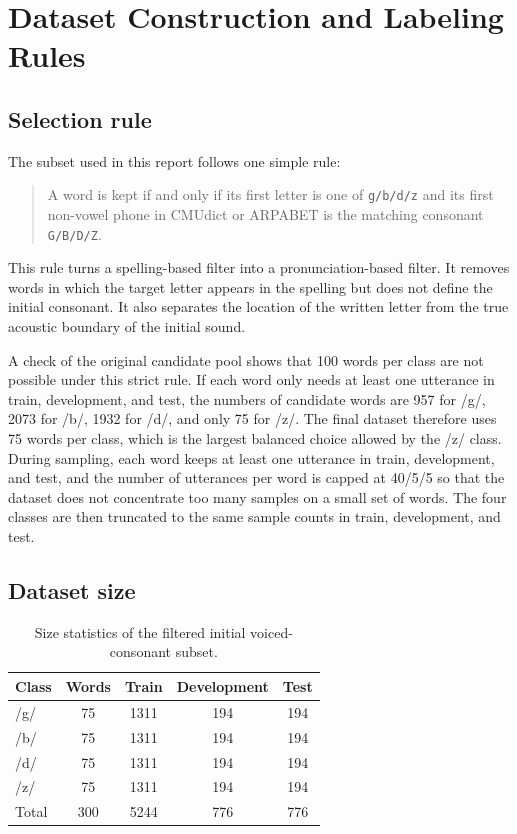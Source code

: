\section{Dataset Construction and Labeling Rules}

\subsection{Selection rule}

The subset used in this report follows one simple rule:
\begin{quote}
A word is kept if and only if its first letter is one of \texttt{g/b/d/z} and its first non-vowel phone in CMUdict or ARPABET is the matching consonant \texttt{G/B/D/Z}.
\end{quote}

This rule turns a spelling-based filter into a pronunciation-based filter. It removes words in which the target letter appears in the spelling but does not define the initial consonant. It also separates the location of the written letter from the true acoustic boundary of the initial sound.

A check of the original candidate pool shows that 100 words per class are not possible under this strict rule. If each word only needs at least one utterance in train, development, and test, the numbers of candidate words are 957 for /g/, 2073 for /b/, 1932 for /d/, and only 75 for /z/. The final dataset therefore uses 75 words per class, which is the largest balanced choice allowed by the /z/ class. During sampling, each word keeps at least one utterance in train, development, and test, and the number of utterances per word is capped at 40/5/5 so that the dataset does not concentrate too many samples on a small set of words. The four classes are then truncated to the same sample counts in train, development, and test.

\subsection{Dataset size}

\begin{table}[H]
    \centering
    \caption{Size statistics of the filtered initial voiced-consonant subset.}
    \label{tab:dataset}
    \begin{tabular}{lcccc}
        \toprule
        Class & Words & Train & Development & Test \\
        \midrule
        /g/ & 75 & 1311 & 194 & 194 \\
        /b/ & 75 & 1311 & 194 & 194 \\
        /d/ & 75 & 1311 & 194 & 194 \\
        /z/ & 75 & 1311 & 194 & 194 \\
        \midrule
        Total & 300 & 5244 & 776 & 776 \\
        \bottomrule
    \end{tabular}
\end{table}

